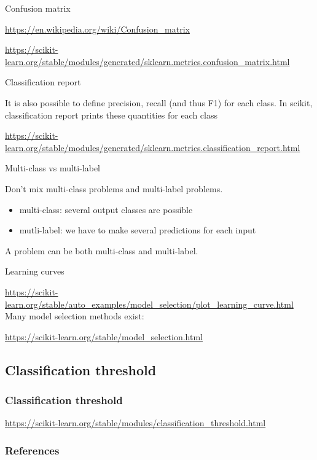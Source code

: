 \documentclass[usenames,dvipsnames]{beamer}
\begin{document}
\begin{frame}{Confusion matrix}

    \url{https://en.wikipedia.org/wiki/Confusion_matrix} 

    \url{https://scikit-learn.org/stable/modules/generated/sklearn.metrics.confusion_matrix.html} 
    
\end{frame}

\begin{frame}{Classification report}

    It is also possible to define precision, recall (and thus F1) for each
    class. In scikit, classification report prints these quantities for each
    class

    \url{https://scikit-learn.org/stable/modules/generated/sklearn.metrics.classification_report.html} 
    
\end{frame}

\begin{frame}{Multi-class vs multi-label}

    Don't mix multi-class problems and multi-label problems.
    \begin{itemize}
        \item multi-class: several output classes are possible
        \item mutli-label: we have to make several predictions for each input
    \end{itemize}

    A problem can be both multi-class and multi-label.
    
\end{frame}

\begin{frame}{Learning curves}

    \url{https://scikit-learn.org/stable/auto_examples/model_selection/plot_learning_curve.html} 
    \\

    Many model selection methods exist:

    \url{https://scikit-learn.org/stable/model_selection.html} 
    
\end{frame}

\subsection{Classification threshold}%
\label{sub:classification_threshold}

\begin{frame}
    \frametitle{Classification threshold}

    \url{https://scikit-learn.org/stable/modules/classification_threshold.html}

\end{frame}


\begin{frame}[allowframebreaks]
\frametitle{References}

 
\end{frame}
\end{document}
